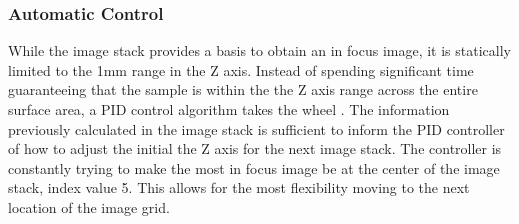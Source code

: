 \documentclass[a4paper,12pt]{article}
\begin{document}
\subsubsection{Automatic Control}
While the image stack provides a basis to obtain an in focus image, it is statically limited to the 1mm range in the Z axis. Instead of spending significant time guaranteeing that the sample
is within the the Z axis range across the entire surface area, a PID control algorithm takes the wheel \citep{odwyer_summary_2000}. The information previously calculated in the image stack is sufficient 
to inform the PID controller of how to adjust the initial the Z axis for the next image stack. The controller is constantly trying to make the most in focus image be at the center of the image stack,
index value 5. This allows for the most flexibility moving to the next location of the image grid. 
\end{document}
